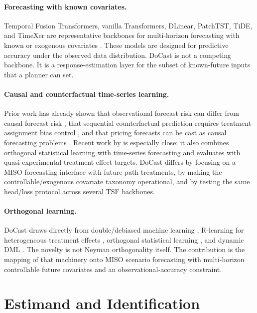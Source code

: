 \documentclass[11pt]{article}
\begin{document}
\paragraph{Forecasting with known covariates.}
Temporal Fusion Transformers, vanilla Transformers, DLinear, PatchTST, TiDE, and TimeXer are
representative backbones for multi-horizon forecasting with known or exogenous
covariates \citep{lim2021tft,vaswani2017transformer,zeng2023dlinear,nie2023patchtst,das2023tide,wang2024timexer}.
These models are designed for predictive accuracy under the observed data
distribution. DoCast is not a competing backbone. It is a response-estimation
layer for the subset of known-future inputs that a planner can set.

\paragraph{Causal and counterfactual time-series learning.}
Prior work has already shown that observational forecast risk can differ from
causal forecast risk \citep{vankadara2022causalforecasting}, that sequential
counterfactual prediction requires treatment-assignment bias control
\citep{bica2020crn}, and that pricing forecasts can be cast as causal
forecasting problems \citep{schultz2023causalpricing}. Recent work by
\citet{crasson2024causalts} is especially close: it also combines orthogonal
statistical learning with time-series forecasting and evaluates with
quasi-experimental treatment-effect targets. DoCast differs by focusing on a
MISO forecasting interface with future path treatments, by making the
controllable/exogenous covariate taxonomy operational, and by testing the same
head/loss protocol across several TSF backbones.

\paragraph{Orthogonal learning.}
DoCast draws directly from double/debiased machine learning
\citep{chernozhukov2018dml}, R-learning for heterogeneous treatment effects
\citep{nie2021rl}, orthogonal statistical learning
\citep{foster2023orthogonal}, and dynamic DML \citep{lewis2021dynamicdml}. The
novelty is not Neyman orthogonality itself. The contribution is the mapping of
that machinery onto MISO scenario forecasting with multi-horizon controllable
future covariates and an observational-accuracy constraint.

\section{Estimand and Identification}
\end{document}
